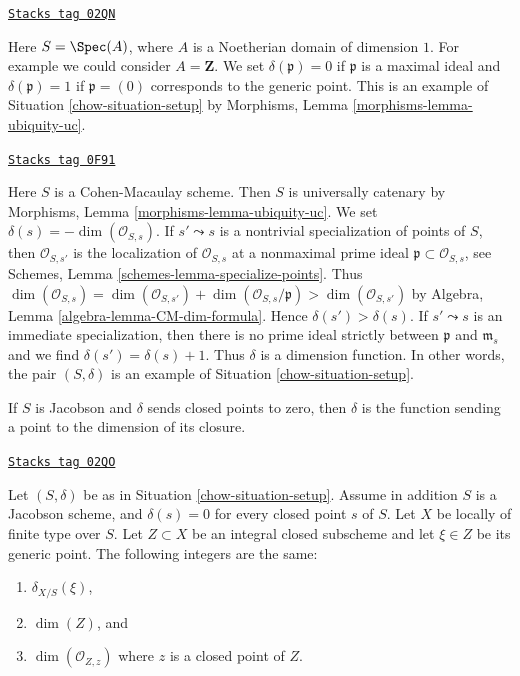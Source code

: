 \begin{example}
\label{chow-example-domain-dimension-1}
\href{https://stacks.math.columbia.edu/tag/02QN}{\texttt{Stacks tag 02QN}}

Here $S = \Spec(A)$, where $A$ is a Noetherian domain
of dimension $1$.
For example we could consider $A = \mathbf{Z}$.
We set $\delta(\mathfrak p) = 0$ if
$\mathfrak p$ is a maximal ideal and $\delta(\mathfrak p) = 1$
if $\mathfrak p = (0)$ corresponds to the generic point.
This is an example of Situation \ref{chow-situation-setup} by
Morphisms, Lemma \ref{morphisms-lemma-ubiquity-uc}.
\end{example}

\begin{example}[CM irreducible]
\label{chow-example-CM-irreducible}
\href{https://stacks.math.columbia.edu/tag/0F91}{\texttt{Stacks tag 0F91}}

Here $S$ is a Cohen-Macaulay scheme. Then $S$ is universally catenary by
Morphisms, Lemma \ref{morphisms-lemma-ubiquity-uc}.
We set $\delta(s) = -\dim(\mathcal{O}_{S, s})$.
If $s' \leadsto s$ is a nontrivial specialization of points of $S$,
then $\mathcal{O}_{S, s'}$ is the localization of $\mathcal{O}_{S, s}$
at a nonmaximal prime ideal $\mathfrak p \subset \mathcal{O}_{S, s}$, see
Schemes, Lemma \ref{schemes-lemma-specialize-points}.
Thus $\dim(\mathcal{O}_{S, s}) =
\dim(\mathcal{O}_{S, s'}) + \dim(\mathcal{O}_{S, s}/\mathfrak p) >
\dim(\mathcal{O}_{S, s'})$ by
Algebra, Lemma \ref{algebra-lemma-CM-dim-formula}.
Hence $\delta(s') > \delta(s)$. If $s' \leadsto s$ is
an immediate specialization, then there is no prime
ideal strictly between $\mathfrak p$ and $\mathfrak m_s$
and we find $\delta(s') = \delta(s) + 1$. Thus $\delta$
is a dimension function. In other words, the pair $(S, \delta)$
is an example of Situation \ref{chow-situation-setup}.
\end{example}

If $S$ is Jacobson and $\delta$ sends closed points to zero, then $\delta$
is the function sending a point to the dimension of its closure.

\begin{lemma}
\label{chow-lemma-delta-is-dimension}
\href{https://stacks.math.columbia.edu/tag/02QO}{\texttt{Stacks tag 02QO}}

Let $(S, \delta)$ be as in Situation \ref{chow-situation-setup}.
Assume in addition $S$ is a Jacobson scheme, and $\delta(s) = 0$ for every
closed point $s$ of $S$. Let $X$ be locally of finite type over $S$.
Let $Z \subset X$ be an integral closed subscheme and let
$\xi \in Z$ be its generic point. The following integers are the same:
\begin{enumerate}
\item $\delta_{X/S}(\xi)$,
\item $\dim(Z)$, and
\item $\dim(\mathcal{O}_{Z, z})$ where $z$ is a closed point of $Z$.
\end{enumerate}
\end{lemma}


